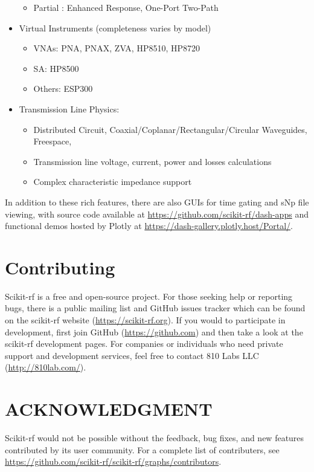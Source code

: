 \documentclass{IEEEjmw}
\begin{document}
\begin{itemize}
\begin{itemize}
		\item Partial : Enhanced Response, One-Port Two-Path
	\end{itemize}
\item	Virtual Instruments (completeness varies by model)
	\begin{itemize}
		\item VNAs: PNA, PNAX, ZVA, HP8510, HP8720
		\item SA: HP8500
		\item Others: ESP300
	\end{itemize}
\item	Transmission Line Physics:
	\begin{itemize}
		\item Distributed Circuit, Coaxial/Coplanar/Rectangular/Circular Waveguides, Freespace, 
		\item Transmission line voltage, current, power and losses calculations
		\item Complex characteristic impedance support
	\end{itemize}

\end{itemize}

In addition to these rich features, there are also GUIs for time gating and sNp file viewing, with source code available at \url{https://github.com/scikit-rf/dash-apps} and functional demos hosted by Plotly at \url{https://dash-gallery.plotly.host/Portal/}. 

\section{Contributing}
Scikit-rf is a free and open-source project. For those seeking help or reporting bugs, there is a public mailing list and GitHub issues tracker which can be found on the scikit-rf website (\url{https://scikit-rf.org}). If you would to participate in development, first join GitHub (\url{https://github.com}) and then take a look at the scikit-rf development pages. For companies or individuals who need private support and development services, feel free to contact 810 Labs LLC (\url{http://810lab.com/}).

\section*{ACKNOWLEDGMENT}
Scikit-rf would not be possible without the feedback, bug fixes, and new features contributed by its user community. For a complete list of contributers, see \url{https://github.com/scikit-rf/scikit-rf/graphs/contributors}.


%


\end{document}

